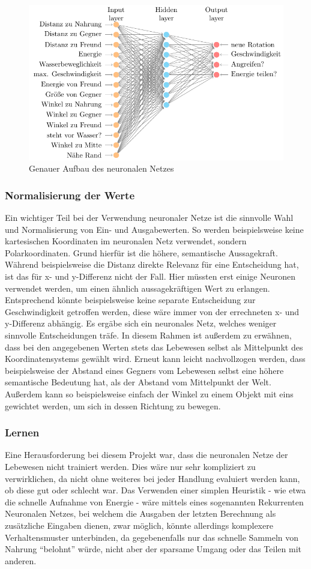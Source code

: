 \documentclass[course=erap]{aspdoc}
\begin{document}
\begin{figure}[H]
    \centering
    \includegraphics[width=.85\textwidth]{res/neuralnet.pdf}
    \caption{Genauer Aufbau des neuronalen Netzes}
    \label{fig:neural-net}
\end{figure}

\subsubsection{Normalisierung der Werte}
Ein wichtiger Teil bei der Verwendung neuronaler Netze ist die sinnvolle Wahl und Normalisierung von Ein- und Ausgabewerten. So werden beispielsweise keine kartesischen Koordinaten im neuronalen Netz verwendet, sondern Polarkoordinaten. Grund hierfür ist die höhere, semantische Aussagekraft. Während beispielsweise die Distanz direkte Relevanz für eine Entscheidung hat, ist das für x- und y-Differenz nicht der Fall. Hier müssten erst einige Neuronen verwendet werden, um einen ähnlich aussagekräftigen Wert zu erlangen. Entsprechend könnte beispielsweise keine separate Entscheidung zur Geschwindigkeit getroffen werden, diese wäre immer von der errechneten x- und y-Differenz abhängig. Es ergäbe sich ein neuronales Netz, welches weniger sinnvolle Entscheidungen träfe. In diesem Rahmen ist außerdem zu erwähnen, dass bei den angegebenen Werten stets das Lebewesen selbst als Mittelpunkt des Koordinatensystems gewählt wird. Erneut kann leicht nachvollzogen werden, dass beispielsweise der Abstand eines Gegners vom Lebewesen selbst eine höhere semantische Bedeutung hat, als der Abstand vom Mittelpunkt der Welt. Außerdem kann so beispielsweise einfach der Winkel zu einem Objekt mit eins gewichtet werden, um sich in dessen Richtung zu bewegen.


\subsubsection{Lernen}
Eine Herausforderung bei diesem Projekt war, dass die neuronalen Netze der Lebewesen nicht trainiert werden. Dies wäre nur sehr kompliziert zu verwirklichen, da nicht ohne weiteres bei jeder Handlung evaluiert werden kann, ob diese gut oder schlecht war. Das Verwenden einer simplen Heuristik - wie etwa die schnelle Aufnahme von Energie - wäre mittels eines sogenannten Rekurrenten Neuronalen Netzes, bei welchem die Ausgaben der letzten Berechnung als zusätzliche Eingaben dienen, zwar möglich, könnte allerdings komplexere Verhaltensmuster unterbinden, da gegebenenfalls nur das schnelle Sammeln von Nahrung "`belohnt"' würde, nicht aber der sparsame Umgang oder das Teilen mit anderen.
\end{document}

